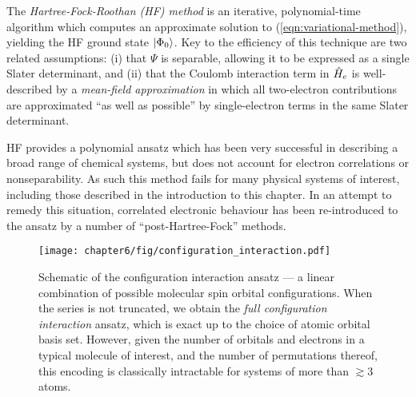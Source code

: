 The \emph{Hartree-Fock-Roothan (HF) method} is an iterative, polynomial-time algorithm which computes an approximate solution to (\ref{eqn:variational-method}), yielding the HF ground state $\mbox{$ | \Phi_0 \rangle $}$.  Key to the efficiency of this technique are two related assumptions: (i) that $\Psi$ is separable, allowing it to be expressed as a single Slater determinant,  and (ii) that the Coulomb interaction term in $\hat{H}_e$ is well-described by a \emph{mean-field approximation} in which all two-electron contributions are approximated ``as well as possible'' by single-electron terms in the same Slater determinant.  

HF provides a polynomial ansatz which has been very successful in describing a broad range of chemical systems, but does not account for electron correlations or nonseparability. As such this method fails for many physical systems of interest, including those described in the introduction to this chapter. In an attempt to remedy this situation, correlated electronic behaviour has been re-introduced to the ansatz by a number of ``post-Hartree-Fock'' methods. 

\begin{figure}[t!]
\centering
\texttt{[image: chapter6/fig/configuration\_interaction.pdf]}
\caption[Configuration interaction ansatz]{
Schematic of the configuration interaction ansatz --- a linear combination of possible molecular spin orbital configurations. When the series is not truncated, we obtain the \emph{full configuration interaction} ansatz, which is exact up to the choice of atomic orbital basis set. However, given the number of orbitals and electrons in a typical molecule of interest, and the number of permutations thereof, this encoding is classically intractable for systems of more than $\gtrsim 3$ atoms. }
\label{fig:configuration-interaction}
\end{figure}

